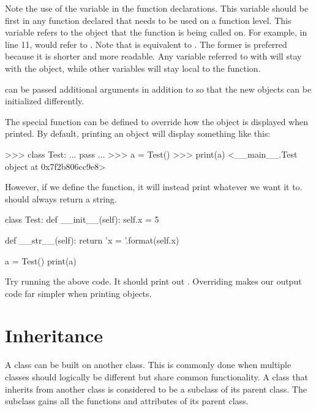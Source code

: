 \documentclass[11pt]{cselabheader}
\begin{document}
Note the use of the variable  in the function declarations.
This variable should be first in any function declared that needs to be used on
a function level. This variable refers to the object that the function is
being called on. For example, in line 11,  would refer to
. Note that  is equivalent to
. The former is preferred because it is shorter
and more readable. Any variable referred to with
 will stay with the object, while other
variables will stay local to the function.

 can be passed additional arguments in addition to
 so that the new objects can be initialized differently.

The special function  can be defined to override
how the object is displayed when printed. By default, printing an object will
display something like this:

\begin{pyconcode}
>>> class Test:
...     pass
...
>>> a = Test()
>>> print(a)
<__main__.Test object at 0x7f2b806cc9e8>
\end{pyconcode}

However, if we define the function, it will instead print whatever we want it
to.  should always return a string.

\begin{python3code}
class Test:
    def __init__(self):
        self.x = 5

    def __str__(self):
        return 'x = {}'.format(self.x)

a = Test()
print(a)
\end{python3code}

Try running the above code. It should print out . Overriding
 makes our output code far simpler when printing objects.

\section{Inheritance}
\label{sec:inheritance}
A class can be built on another class. This is commonly done when multiple
classes should logically be different but share common functionality. A class
that inherits from another class is considered to be a subclass of its parent
class. The subclass gains all the functions and attributes of its parent class.
\end{document}

